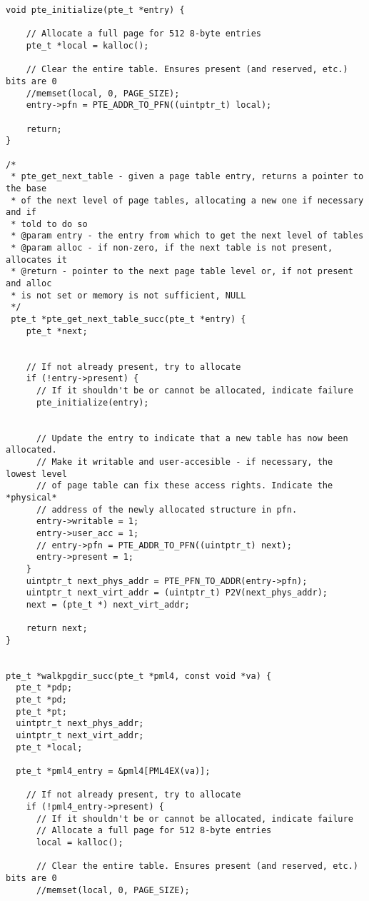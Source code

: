 \begin{lstlisting}[style=CStyle]
void pte_initialize(pte_t *entry) {
   
    // Allocate a full page for 512 8-byte entries
    pte_t *local = kalloc();
   
    // Clear the entire table. Ensures present (and reserved, etc.) bits are 0
    //memset(local, 0, PAGE_SIZE);
    entry->pfn = PTE_ADDR_TO_PFN((uintptr_t) local);

    return;
}

/*
 * pte_get_next_table - given a page table entry, returns a pointer to the base
 * of the next level of page tables, allocating a new one if necessary and if
 * told to do so
 * @param entry - the entry from which to get the next level of tables
 * @param alloc - if non-zero, if the next table is not present, allocates it
 * @return - pointer to the next page table level or, if not present and alloc
 * is not set or memory is not sufficient, NULL
 */
 pte_t *pte_get_next_table_succ(pte_t *entry) {
    pte_t *next;
   
    
    // If not already present, try to allocate
    if (!entry->present) {
      // If it shouldn't be or cannot be allocated, indicate failure
      pte_initialize(entry);
     

      // Update the entry to indicate that a new table has now been allocated.
      // Make it writable and user-accesible - if necessary, the lowest level
      // of page table can fix these access rights. Indicate the *physical*
      // address of the newly allocated structure in pfn.
      entry->writable = 1;
      entry->user_acc = 1;
      // entry->pfn = PTE_ADDR_TO_PFN((uintptr_t) next);
      entry->present = 1;
    }
    uintptr_t next_phys_addr = PTE_PFN_TO_ADDR(entry->pfn);
    uintptr_t next_virt_addr = (uintptr_t) P2V(next_phys_addr);
    next = (pte_t *) next_virt_addr;

    return next;
}


pte_t *walkpgdir_succ(pte_t *pml4, const void *va) {
  pte_t *pdp;
  pte_t *pd;
  pte_t *pt;
  uintptr_t next_phys_addr;
  uintptr_t next_virt_addr;  
  pte_t *local;
   
  pte_t *pml4_entry = &pml4[PML4EX(va)];
    
    // If not already present, try to allocate
    if (!pml4_entry->present) {
      // If it shouldn't be or cannot be allocated, indicate failure
      // Allocate a full page for 512 8-byte entries
      local = kalloc();
   
      // Clear the entire table. Ensures present (and reserved, etc.) bits are 0
      //memset(local, 0, PAGE_SIZE);
      

\end{lstlisting}

